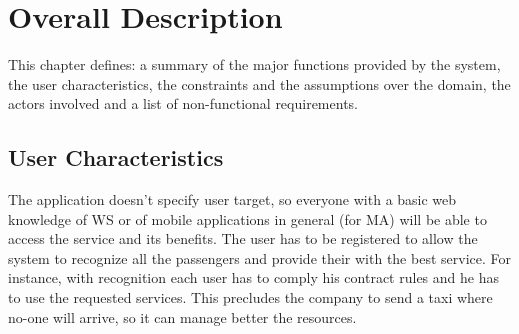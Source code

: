 \chapter{Overall Description}

\setmyfancystyle

\label{overall}
This chapter defines: a summary of the major functions provided by the system, the user characteristics, the constraints and the assumptions over the domain, the actors involved and a list of non-functional requirements.
 
\section{User Characteristics}
The application doesn't specify user target, so everyone with a basic web knowledge of WS or of mobile applications in general (for MA) will be able to access the service and its benefits. The user has to be registered to allow the system to recognize all the passengers and provide their with the best service. For instance, with recognition each user has to comply his contract rules and he has to use the requested services. This precludes the company to send a taxi where no-one will arrive, so it can manage better the resources.

